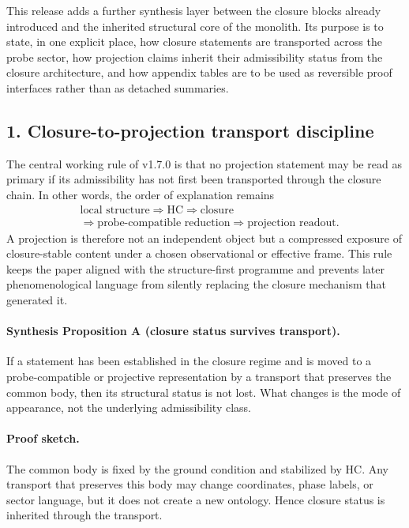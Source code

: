This release adds a further synthesis layer between the closure blocks already
introduced and the inherited structural core of the monolith. Its purpose is to
state, in one explicit place, how closure statements are transported across the
probe sector, how projection claims inherit their admissibility status from the
closure architecture, and how appendix tables are to be used as reversible proof
interfaces rather than as detached summaries.

\subsection*{1. Closure-to-projection transport discipline}
The central working rule of v1.7.0 is that no projection statement may be
read as primary if its admissibility has not first been transported through the
closure chain. In other words, the order of explanation remains
\[
\begin{aligned}
&\text{local structure}
\Longrightarrow \text{HC}
\Longrightarrow \text{closure}\\[0.15em]
&\Longrightarrow \text{probe-compatible reduction}
\Longrightarrow \text{projection readout}.
\end{aligned}
\]
A projection is therefore not an independent object but a compressed exposure of
closure-stable content under a chosen observational or effective frame. This
rule keeps the paper aligned with the structure-first programme and prevents
later phenomenological language from silently replacing the closure mechanism
that generated it.

\paragraph{Synthesis Proposition A (closure status survives transport).}
If a statement has been established in the closure regime and is moved to a
probe-compatible or projective representation by a transport that preserves the
common body, then its structural status is not lost. What changes is the mode of
appearance, not the underlying admissibility class.

\paragraph{Proof sketch.}
The common body is fixed by the ground condition and stabilized by HC. Any
transport that preserves this body may change coordinates, phase labels, or
sector language, but it does not create a new ontology. Hence closure status is
inherited through the transport.

